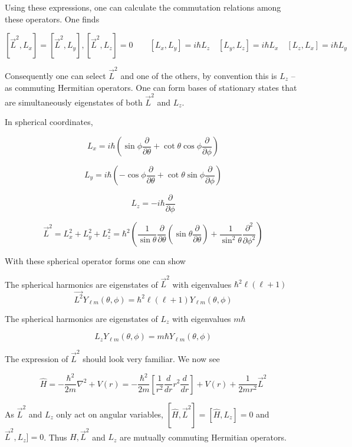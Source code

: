 Using these expressions, one can calculate the commutation relations among
these operators. One finds 

\[
  [\vec{L}^2, L_x] = [\vec{L}^2, L_y], [\vec{L}^2, L_z] = 0 \qquad [L_x, L_y]
  = i\hbar L_z \quad [L_y, L_z] = i\hbar L_x \quad [L_z, L_x] = i\hbar L_y
\] \vspace{3px}

Consequently one can select $\vec{L}^2$ and one of the others, by convention
this is $L_z$ -- as commuting Hermitian operators. One can form bases of
stationary states that are simultaneously eigenstates of both $\vec{L}^2$ and
$L_z$. 


In spherical coordinates, 

\[
L_x = i\hbar \left( \sin\phi \frac{\partial}{\partial \theta} + \cot\theta \cos\phi \frac{\partial}{\partial \phi} \right)
\]

\[
L_y = i\hbar \left( -\cos\phi \frac{\partial}{\partial \theta} + \cot\theta \sin\phi \frac{\partial}{\partial \phi} \right)
\]

\[
L_z = -i\hbar \frac{\partial}{\partial \phi}
\]

\[
\vec{L}^2 = L_x^2 + L_y^2 + L_z^2 = \hbar^2 \left( \frac{1}{\sin\theta} \frac{\partial}{\partial \theta} \left( \sin\theta \frac{\partial}{\partial \theta} \right) + \frac{1}{\sin^2 \theta} \frac{\partial^2}{\partial \phi^2} \right)
\]


With these spherical operator forms one can show 

\begin{subbox}{}
  The spherical harmonics are eigenstates of $\vec{L}^2$ with eigenvalues
  $\hbar^2\ell (\ell +1)$
  \[ \vec{L^2}Y_{\ell m} (\theta, \phi) = \hbar^2 \ell (\ell +1) Y_{\ell
  m}(\theta, \phi) \] \vspace{3px}

  The spherical harmonics are eigenstates of $L_z$ with eigenvalues $m\hbar$

   \[
     L_z Y_{\ell m} (\theta, \phi) = m\hbar Y_{\ell m}(\theta, \phi)
  \] 
\end{subbox}

The expression of $\vec{L}^2$ should look very familiar. We now see 

\[
\hat{H} = -\frac{\hbar^2}{2m}\nabla^2 + V(r) = -\frac{\hbar^2}{2m} \left[
\frac{1}{r^2} \frac{d }{d r} r^2 \frac{d }{d r} \right] + V(r)
+ \frac{1}{2mr^2}\vec{L}^2
\] \vspace{3px}


As $\vec{L}^2$ and $L_z$ only act on angular variables, $[\hat{H}, \vec{L}^2]
= [\hat{H}, L_z] = 0$ and $\vec{L}^2, L_z]  =0$. Thus $\hat{H}, \vec{L}^2$ and
$L_z$ are mutually commuting Hermitian operators. 

